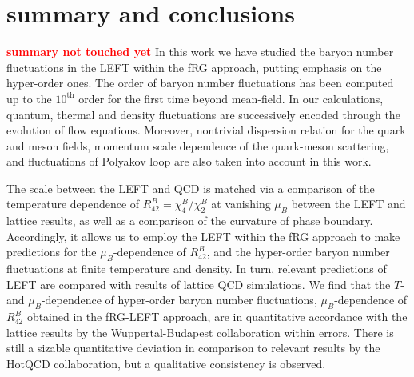 \documentclass[%
reprint,
superscriptaddress,
showpacs,preprintnumbers,
amsmath,amssymb,
aps,
prd,
]{revtex4-1}
\newcommand{\coljan}[1]{\textcolor{red}{#1}}
\begin{document}
\section{summary and conclusions}
\label{sec:summary}
	
\coljan{\bf summary not touched yet}
In this work we have studied the baryon number fluctuations in the LEFT within the fRG approach, putting emphasis on the hyper-order ones. The order of baryon number fluctuations has been computed up to the $10^{\mathrm{th}}$ order for the first time beyond mean-field. In our calculations, quantum, thermal and density fluctuations are successively encoded through the evolution of flow equations. Moreover, nontrivial dispersion relation for the quark and meson fields, momentum scale dependence of the quark-meson scattering, and fluctuations of Polyakov loop are also taken into account in this work.
	
The scale between the LEFT and QCD is matched via a comparison of the temperature dependence of $R^{B}_{42}=\chi^{B}_{4}/\chi^{B}_{2}$ at vanishing $\mu_B$ between the LEFT and lattice results, as well as a comparison of the curvature of phase boundary. Accordingly, it allows us to employ the LEFT within the fRG approach to make predictions for the $\mu_B$-dependence of $R^{B}_{42}$, and the hyper-order baryon number fluctuations at finite temperature and density. In turn, relevant predictions of LEFT are compared with results of lattice QCD simulations. We find that the $T$- and $\mu_B$-dependence of hyper-order baryon number fluctuations, $\mu_B$-dependence of $R^{B}_{42}$ obtained in the fRG-LEFT approach, are in quantitative accordance with the lattice results by the Wuppertal-Budapest collaboration within errors. There is still a sizable quantitative deviation in comparison to relevant results by the HotQCD collaboration, but a qualitative consistency is observed.
	
\end{document}
